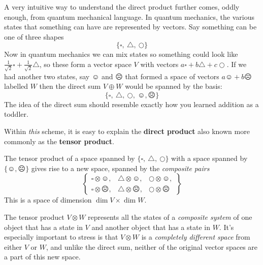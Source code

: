 \documentclass[../master.tex]{subfiles}
\begin{document}
	A very intuitive way to understand the direct product further comes, oddly enough, from quantum mechanical language. In quantum mechanics, the various states that something can have are represented by vectors. Say something can be one of three shapes
	\begin{equation*}
		\{ \square, ~ \triangle,  ~ \bigcirc \}
	\end{equation*}
	Now in quantum mechanics we can mix states so something could look like $\frac{1}{\sqrt 2} \square + \frac{1}{\sqrt 2} \triangle$, so these form a vector space $V$ with vectors $a \square + b \triangle + c \bigcirc$. If we had another two states, say $\smiley$ and $\frownie$ that formed a space of vectors $a \smiley + b \frownie$ labelled $W$ then the direct sum $V \oplus W$ would be spanned by the basis:
	\begin{equation*}
		\{ \square, ~ \triangle,  ~ \bigcirc, ~ \smiley,  \frownie \}
	\end{equation*}
	The idea of the direct sum should resemble exactly how you learned addition as a toddler.
	
	Within \emph{this} scheme, it is easy to explain the \textbf{direct product} also known more commonly as the \textbf{tensor product}. 
	\begin{view}
		The tensor product of a space spanned by $\{ \square, ~ \triangle,  ~ \bigcirc \}$ with a space spanned by $\{ \smiley, \frownie \}$ gives rise to a new space, spanned by the \emph{composite pairs}
		\begin{equation*}
			\begin{Bmatrix}
			 \square \otimes \smiley, & \triangle \otimes \smiley,  & \bigcirc  \otimes  \smiley, \\
			\square \otimes \frownie, & \triangle \otimes \frownie,  & \bigcirc  \otimes \frownie ~	
			\end{Bmatrix}
		\end{equation*}
		This is a space of dimension $\dim V \times \dim W$.
	\end{view}
	The tensor product $V \otimes W$ represents all the states of a \emph{composite system} of one object that has a state in $V$ and another object that has a state in $W$. It's especially important to stress is that $V \otimes W$ is a \emph{completely different space} from either $V$ or $W$, and unlike the direct sum, neither of the original vector spaces are a part of this new space.
	
\end{document}
